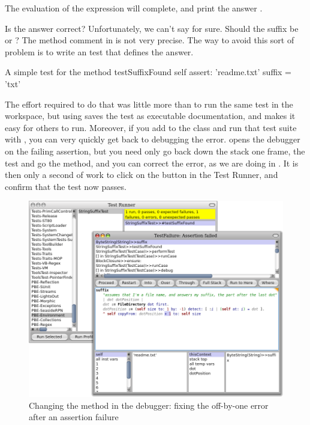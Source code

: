 \documentclass[a4paper,10pt,twoside]{book}
\begin{document}

The evaluation of the expression  will complete, and print the answer .

Is the answer correct?  Unfortunately, we can't say for sure.  Should the suffix be  or ?
The method comment in  is not very precise.  
The way to avoid this sort of problem is to write an  test that defines the answer.

\begin{method}[testSuffix]{A simple test for the  method}
testSuffixFound
	self assert: 'readme.txt' suffix = 'txt'
\end{method}

The effort required to do that was little more than to run the same test in the workspace, but using \sunit saves the test as executable documentation, and makes it easy for others to run.
Moreover, if you add  to the class  and run that test suite with \sunit, you can very quickly get back to debugging the error.
\sunit opens the debugger on the failing assertion, but you need only go back down the stack one frame,  the test and go  the  method, and you can correct the error, as we are doing in .
It is then only  a second of work to click on the  button in the \sunit Test Runner, and confirm that the test now passes.

\begin{figure}[btp]
	\begin{center}
		\includegraphics[width=\textwidth]{fixOffByOne}
	\end{center}
	\caption{Changing the  method in the debugger: fixing the off-by-one error after an \sunit assertion failure}
\end{figure}
\end{document}
